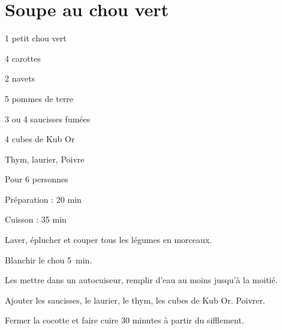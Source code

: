 \section[\normalsize{Soupe au chou vert}]{Soupe au chou vert}


\begin{ingredients}
\item 1 petit chou vert
\item 4 carottes
\item 2 navets
\item 5 pommes de terre
\item 3 ou 4 saucisses fum\'ees
\item 4 cubes de Kub Or
\item Thym, laurier, Poivre
\end{ingredients}
\begin{infos}
\item Pour 6 personnes
\item Préparation : 20 min
\item Cuisson : 35 min
\end{infos}

\begin{etapes}
\item Laver, \'eplucher et couper tous les l\'egumes en morceaux.
\item Blanchir le chou 5~min.
\item Les mettre dans un autocuiseur, remplir d'eau au moins 
jusqu'\`a la moiti\'e. 
\item Ajouter les saucisses, le laurier, le thym, les cubes de 
Kub Or. Poivrer.
\item Fermer la cocotte et faire cuire 30 minutes \`a partir du 
sifflement.
\end{etapes}
\begin{conseils}
\end{conseils}
